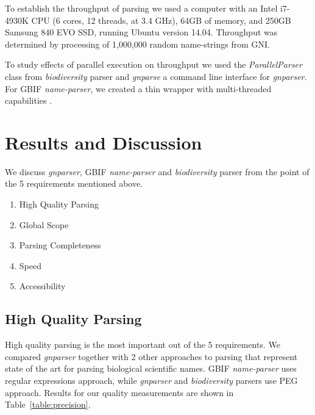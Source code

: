 \documentclass{bmcart}
\begin{document}
To establish the throughput of parsing we used a computer with an Intel i7-4930K
CPU (6 cores, 12 threads, at 3.4 GHz), 64GB of memory, and 250GB Samsung 840
EVO SSD, running Ubuntu version 14.04. Throughput was determined by processing
of 1,000,000 random name-strings from GNI.

To study effects of parallel execution on throughput we used the
\textit{ParallelParser} class from \textit{biodiversity} parser and
\textit{gnparse} a command line interface for \textit{gnparser}. For GBIF
\textit{name-parser}, we created a thin wrapper with multi-threaded
capabilities \cite{gbifparser}.

\section*{Results and Discussion}



We discuss \textit{gnparser}, GBIF \textit{name-parser} and
\textit{biodiversity} parser from the point of the 5 requirements mentioned
above.

\begin{enumerate}
  \item High Quality Parsing
  \item Global Scope
  \item Parsing Completeness
  \item Speed
  \item Accessibility
\end{enumerate}

\subsection*{High Quality Parsing}

High quality parsing is the most important out of the 5 requirements.
We compared \textit{gnparser} together with 2 other approaches to parsing that represent state of the art for parsing biological
scientific names. GBIF \textit{name-parser} uses regular expressions approach,
while \textit{gnparser} and \textit{biodiversity} parsers use PEG approach.
Results for our quality measurements are shown in Table~\ref{table:precision}.
\end{document}
